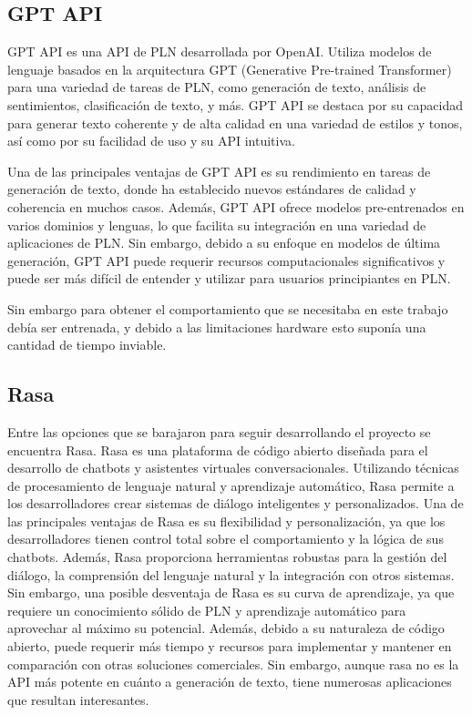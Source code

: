 \subsection{GPT API}

GPT API es una API de PLN desarrollada por OpenAI. Utiliza modelos de lenguaje basados en la arquitectura GPT (Generative Pre-trained Transformer) para una variedad de tareas de PLN, como generación de texto, análisis de sentimientos, clasificación de texto, y más. GPT API se destaca por su capacidad para generar texto coherente y de alta calidad en una variedad de estilos y tonos, así como por su facilidad de uso y su API intuitiva.

Una de las principales ventajas de GPT API es su rendimiento en tareas de generación de texto, donde ha establecido nuevos estándares de calidad y coherencia en muchos casos. Además, GPT API ofrece modelos pre-entrenados en varios dominios y lenguas, lo que facilita su integración en una variedad de aplicaciones de PLN. Sin embargo, debido a su enfoque en modelos de última generación, GPT API puede requerir recursos computacionales significativos y puede ser más difícil de entender y utilizar para usuarios principiantes en PLN.

Sin embargo para obtener el comportamiento que se necesitaba en este trabajo debía ser entrenada, y debido a las limitaciones hardware esto suponía una cantidad de tiempo inviable. 

\subsection{Rasa}
\label{subsec:rasa}
Entre las opciones que se barajaron para seguir desarrollando el proyecto se encuentra Rasa. Rasa es una plataforma de código abierto diseñada para el desarrollo de chatbots y asistentes virtuales conversacionales. Utilizando técnicas de procesamiento de lenguaje natural y aprendizaje automático, Rasa permite a los desarrolladores crear sistemas de diálogo inteligentes y personalizados. Una de las principales ventajas de Rasa es su flexibilidad y personalización, ya que los desarrolladores tienen control total sobre el comportamiento y la lógica de sus chatbots. Además, Rasa proporciona herramientas robustas para la gestión del diálogo, la comprensión del lenguaje natural y la integración con otros sistemas. Sin embargo, una posible desventaja de Rasa es su curva de aprendizaje, ya que requiere un conocimiento sólido de PLN y aprendizaje automático para aprovechar al máximo su potencial. Además, debido a su naturaleza de código abierto, puede requerir más tiempo y recursos para implementar y mantener en comparación con otras soluciones comerciales. Sin embargo, aunque rasa no es la API más potente en cuánto a generación de texto, tiene numerosas aplicaciones que resultan interesantes. 

